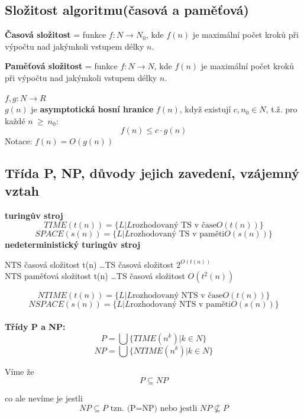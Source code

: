 \documentclass[10pt,a4paper]{article}
\theoremstyle{note}
\begin{document}
	\subsection{Složitost algoritmu(časová a paměťová)}

		\textbf{Časová složitost} = funkce $f : N \rightarrow N_{0}$, kde $f(n)$ je maximální
		počet kroků při výpočtu nad jakýmkoli vstupem délky $n$.\\
		\vspace{3mm}

		\textbf{Paměťová složitost} = funkce $f : N \rightarrow N$, kde $f(n)$ je maximální
		 počet kroků při výpočtu nad jakýmkoli vstupem délky $n$.
		\\\vspace{3mm}

		$f,g : N \rightarrow R$\\
		$g(n)$ je \textbf{asymptotická hosní hranice} $f(n)$, když existují $c, n_{0} \in N$, t.ž. pro každé $n~\geq~n_{0}$:
		$$f(n) \leq c \cdot g(n)$$
		Notace: $f(n) = O(g(n))$


	\subsection{Třída P, NP, důvody jejich zavedení, vzájemný vztah}

		\textbf{turingův stroj}
		$$TIME(t(n)) = \{ L | L \text{rozhodovaný TS v čase} O(t(n))\}$$
		$$SPACE(s(n)) = \{ L | L \text{rozhodovaný TS v paměti} O(s(n))\}$$
		\vspace{3mm}
		\textbf{nedeterministický turingův stroj}

		NTS časová složitost t(n) \dots TS časová složitost $2^{O(t(n))}$\\

		NTS paměťová složitost t(n) \dots TS časová složitost $O(t^{2} (n))$

		$$NTIME(t(n)) = \{ L | L \text{rozhodovaný NTS v čase} O(t(n))\}$$
		$$NSPACE(s(n)) = \{ L | L \text{rozhodovaný NTS v paměti} O(s(n))\}$$\\

		\vspace{3mm}
		\textbf{Třídy P a NP:}
		$$P = \bigcup\{TIME(n^k) | k \in N\}$$
		$$NP = \bigcup\{NTIME(n^k) | k \in N\}$$
	\vspace{3mm}

	Víme že $$P\subseteq NP$$

	co ale nevíme je jestli $$NP\subseteq P \text{ tzn. (P=NP) nebo jestli } NP\nsubseteq P$$
\end{document}
